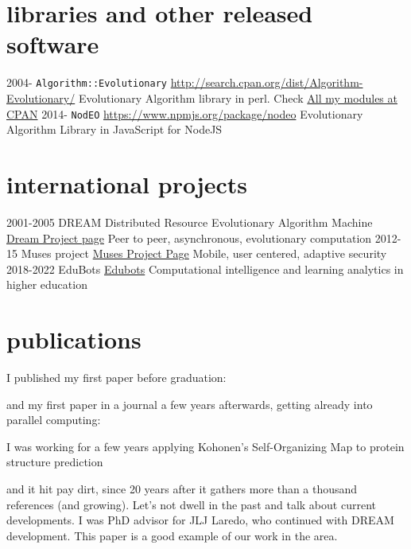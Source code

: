 \documentclass[]{friggeri-jj-cv}
\begin{document}
\section{libraries and other released software}

\begin{entrylist}
  \entry
    {2004-}
    {{\tt Algorithm::Evolutionary}}
    {\href{http://search.cpan.org/dist/Algorithm-Evolutionary/}{http://search.cpan.org/dist/Algorithm-Evolutionary/}}
    {Evolutionary Algorithm library in
      perl. Check \href{http://search.cpan.org/~jmerelo/}{All my modules at CPAN}}
  \entry
    {2014-}
    {{\tt NodEO}}
    {\href{https://npmjs.org/package/nodeo}{https://www.npmjs.org/package/nodeo}}
    {Evolutionary Algorithm Library in JavaScript for NodeJS}
\end{entrylist}

\section{international projects}

\begin{entrylist}
  \entry
    {2001-2005}
    {{\sf DREAM} Distributed Resource Evolutionary Algorithm Machine}
    {\href{http://www.soc.napier.ac.uk/~benp/dream/dream.htm}{Dream
        Project page}}
    {Peer to peer, asynchronous, evolutionary computation}
  \entry
    {2012-15}
    {Muses project}
    {\href{https://musesproject.eu/}{Muses Project Page}}
    {Mobile, user centered, adaptive security}
    \entry
    {2018-2022}
    {EduBots}
    {\href{https://edubots.eu}{Edubots}}
    {Computational intelligence and learning analytics in higher education}
\end{entrylist}

\section{publications}

I published my first paper before graduation:

\cite{merelo88}
and my first paper in a journal a few years
afterwards, getting already into parallel computing:

\cite{parallel90}
I was working for a few years applying Kohonen's Self-Organizing Map to protein structure prediction

\cite{jjproteng} 
and it hit pay dirt, since 20 years after it gathers more than a
thousand references (and growing). Let's not dwell in the past
and talk about current developments. I was PhD advisor for JLJ Laredo,
who continued with DREAM development. This paper is a good example of
our work in the area.
\end{document}
